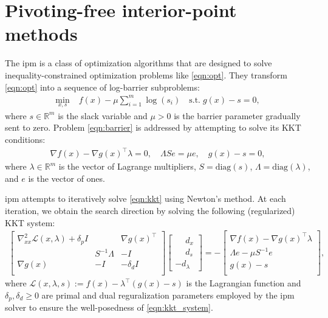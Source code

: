 \documentclass{article}
\begin{document}
\section{Pivoting-free interior-point methods}\label{eqn:ipm}
The \gls*{ipm} is a class of optimization algorithms that are designed to solve inequality-constrained optimization problems like \cref{eqn:opt}.
They transform \cref{eqn:opt} into a sequence of log-barrier subproblems:
\begin{align}\label{eqn:barrier}
  \min_{x,s } \; & f(x) - \mu \sum_{i=1}^m \log(s_i) \quad \text{s.t.} \; g(x) - s = 0 ,
\end{align}
where $s \in \mathbb{R}^m$ is the slack variable and $\mu > 0$ is the barrier parameter gradually sent to zero. Problem \cref{eqn:barrier} is addressed by attempting to solve its KKT conditions:
\begin{align}\label{eqn:kkt}
  \nabla f(x) - \nabla g(x)^\top \lambda = 0, \quad
  \Lambda S e = \mu e,\quad
  g(x) - s =   0 ,
\end{align}
where $\lambda \in \mathbb{R}^m$ is the vector of Lagrange multipliers, $S = \text{diag}(s)$,
 $\Lambda = \text{diag}(\lambda)$, and $e$ is the vector of ones.

\Gls*{ipm} attempts to iteratively solve \cref{eqn:kkt} using Newton's method.
At each iteration, we obtain the
search direction by solving the following (regularized) KKT system:
\begin{align}\label{eqn:kkt_system}
  \begin{bmatrix}
    \nabla^2_{x x} \mathcal{L}(x,\lambda) + \delta_p I&& \nabla g(x)^\top  \\
                                          & S^{-1}\Lambda & -I \\
    \nabla g(x) & -I &  - \delta_d I\\
  \end{bmatrix}
  \begin{bmatrix}
    \phantom{-}d_x\\
    \phantom{-}d_s \\
    -d_\lambda
  \end{bmatrix} =
  -\begin{bmatrix}
    \nabla f(x) - \nabla g(x)^\top \lambda\\
    \Lambda e - \mu S^{-1} e \\
    g(x) - s\\
  \end{bmatrix},
\end{align}
where $\mathcal{L}(x,\lambda,s)  := f(x) - \lambda^\top (g(x) - s)$ is the Lagrangian function and $\delta_p,\delta_d\geq 0$ are primal and dual reguralization parameters employed by the \gls*{ipm} solver to ensure the well-posedness of \cref{eqn:kkt_system}.
\end{document}
